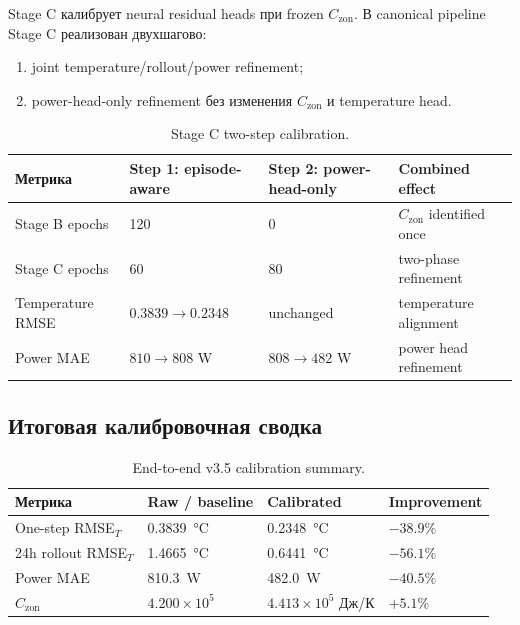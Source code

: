 \documentclass[12pt,a4paper]{article}
\begin{document}
Stage C калибрует neural residual heads при frozen \(C_{\mathrm{zon}}\). В canonical pipeline Stage C реализован двухшагово:

\begin{enumerate}
    \item joint temperature/rollout/power refinement;
    \item power-head-only refinement без изменения \(C_{\mathrm{zon}}\) и temperature head.
\end{enumerate}

\begin{table}[htbp]
\centering
\caption{Stage C two-step calibration.}
\label{tab:stage-c}
\begin{tabular}{llll}
\toprule
Метрика & Step 1: episode-aware & Step 2: power-head-only & Combined effect \\
\midrule
Stage B epochs & 120 & 0 & \(C_{\mathrm{zon}}\) identified once \\
Stage C epochs & 60 & 80 & two-phase refinement \\
Temperature RMSE & \(0.3839\rightarrow 0.2348\) & unchanged & temperature alignment \\
Power MAE & \(810\rightarrow 808\) W & \(808\rightarrow 482\) W & power head refinement \\
\bottomrule
\end{tabular}
\end{table}

\subsection{Итоговая калибровочная сводка}

\begin{table}[htbp]
\centering
\caption{End-to-end v3.5 calibration summary.}
\label{tab:v35-summary}
\begin{tabular}{llll}
\toprule
Метрика & Raw / baseline & Calibrated & Improvement \\
\midrule
One-step RMSE\(_T\) & \SI{0.3839}{\celsius} & \SI{0.2348}{\celsius} & \(-38.9\%\) \\
24h rollout RMSE\(_T\) & \SI{1.4665}{\celsius} & \SI{0.6441}{\celsius} & \(-56.1\%\) \\
Power MAE & \SI{810.3}{W} & \SI{482.0}{W} & \(-40.5\%\) \\
\(C_{\mathrm{zon}}\) & \(4.200\times 10^5\) & \(4.413\times 10^5\) Дж/К & \(+5.1\%\) \\
\bottomrule
\end{tabular}
\end{table}
\end{document}
